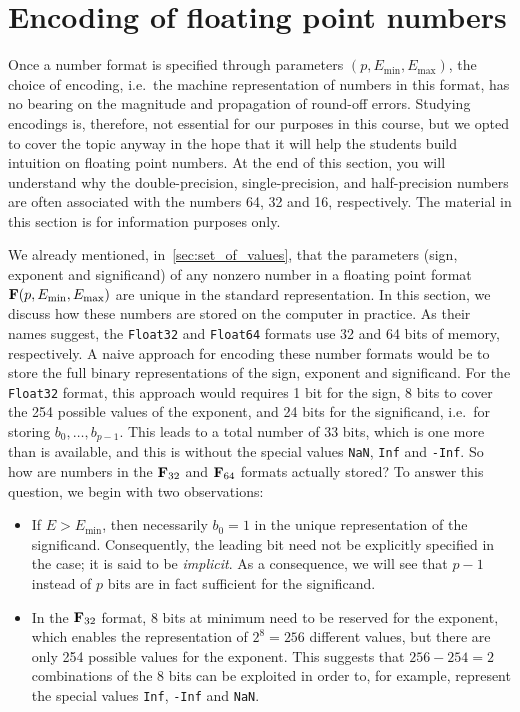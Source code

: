 \section{Encoding of floating point numbers}%
\label{sec:encoding_of_floating_point_numbers}

Once a number format is specified through parameters $(p, E_{\min}, E_{\max})$,
the choice of encoding,
i.e.\ the machine representation of numbers in this format,
has no bearing on the magnitude and propagation of round-off errors.
Studying encodings is, therefore, not essential for our purposes in this course,
but we opted to cover the topic anyway in the hope that it will help the students build intuition on floating point numbers.
At the end of this section, you will understand why the double-precision, single-precision, and half-precision numbers
are often associated with the numbers 64, 32 and 16, respectively.
The material in this section is for information purposes only.

We already mentioned, in~\cref{sec:set_of_values},
that the parameters (sign, exponent and significand) of any nonzero number in a floating point format $\mathbf F(p, E_{\min}, E_{\max})$ are unique in the standard representation.
In this section,
we discuss how these numbers are stored on the computer in practice.
As their names suggest, the \texttt{Float32} and \texttt{Float64} formats use 32 and 64 bits of memory, respectively.
A naive approach for encoding these number formats would be to store the full binary representations of the sign, exponent and significand.
For the \texttt{Float32} format,
this approach would requires 1 bit for the sign,
8 bits to cover the 254 possible values of the exponent, and 24 bits for the significand,
i.e.\ for storing $b_0, \dots, b_{p-1}$.
This leads to a total number of 33 bits,
which is one more than is available,
and this is without the special values \texttt{NaN}, \texttt{Inf} and \texttt{-Inf}.
So how are numbers in the $\mathbf F_{32}$ and $\mathbf F_{64}$ formats actually stored?
To answer this question,
we begin with two observations:
\begin{itemize}
    \item
        If $E > E_{\min}$,
        then necessarily $b_0 = 1$ in the unique representation of the significand.
        Consequently, the leading bit need not be explicitly specified in the case;
        it is said to be \emph{implicit}.
        As a consequence,
        we will see that $p-1$ instead of $p$ bits are in fact sufficient for the significand.
    \item
        In the $\mathbf F_{32}$ format,
        8 bits at minimum need to be reserved for the exponent,
        which enables the representation of $2^8 = 256$ different values,
        but there are only 254 possible values for the exponent.
        This suggests that $256 - 254 = 2$ combinations of the 8 bits can be exploited in order to,
        for example, represent the special values \texttt{Inf}, \texttt{-Inf} and \texttt{NaN}.
\end{itemize}

